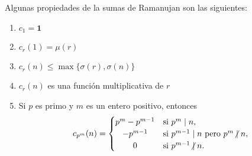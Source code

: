 \begin{proposition}
Algunas propiedades de la sumas de Ramanujan son las siguientes:
\begin{enumerate}[label=\textnormal{(\arabic*)},ref=\textnormal{\arabic*}]
\item $c_1 = \mathbf{1}$
\item $c_r(1) = \mu(r)$
\item $c_r(n) \le \max \{ \sigma(r), \sigma(n) \}$
\item \label{it:ram1} $c_r(n)$ es una función multiplicativa de $r$
\item Si $p$ es primo y $m$ es un entero positivo, entonces
    \begin{equation*}
        c_{p^m}(n) = \begin{cases}
            \hfil p^m - p^{m-1} & \text{si } p^m \mid n, \\
            \hfil -p^{m-1} & \text{si } p^{m-1} \mid n \text{ pero } p^m \centernot\mid n, \\
            \hfil 0 & \text{si } p^{m-1} \centernot\mid n.
        \end{cases}
    \end{equation*}
\end{enumerate}
\end{proposition}

